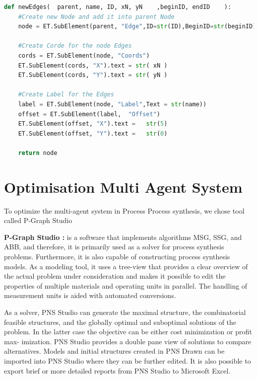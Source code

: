 \begin{lstlisting}[language=Python, caption=Python Function new Edges]
def newEdges(  parent, name, ID, xN, yN    ,beginID, endID    ):
	#Create new Node and add it into parent Node	
	node = ET.SubElement(parent, "Edge",ID=str(ID),BeginID=str(beginID),EndID=str(endID),Rate=str(name),Title=str(name), ArrowOnCenter="true", ArrowPosition="50")  
	
	#Create Corde for the node Edges
	cords = ET.SubElement(node, "Coords")
	ET.SubElement(cords, "X").text = str( xN )
	ET.SubElement(cords, "Y").text = str( yN )
		 		 		  
	#Create Label for the Edges
	label = ET.SubElement(node, "Label",Text = str(name))
	offset = ET.SubElement(label,  "Offset")
	ET.SubElement(offset, "X").text =   str(5)
	ET.SubElement(offset, "Y").text =   str(0)
 
	return node 
\end{lstlisting}


\pagebreak
\section{Optimisation Multi Agent System \label{sec:optim} }

To optimize the multi-agent system in  Process Process synthesis, we chose tool called  P-Graph Studio 

\textbf{P-Graph Studio : }   is a software that implements algorithms MSG, SSG, and ABB, and therefore, it is primarily
used as a solver for process synthesis problems. Furthermore, it is also capable of constructing process synthesis models.
As a modeling tool, it uses a tree-view that provides a clear overview of the actual problem under consideration and makes
it possible to edit the properties of multiple materials and operating units in parallel. The handling of measurement units
is aided with automated conversions. \cite{ ch3-pgraph2, Sitepgraph}

As a solver, PNS Studio can generate the maximal structure, the combinatorial feasible structures, and the globally optimal
and suboptimal solutions of the problem. In the latter case the objective can be either cost minimization or profit max-
imization. PNS Studio provides a double pane view of solutions to compare alternatives.
Models and initial structures created in PNS Drawn can be imported into PNS Studio where they can be further edited. It
is also possible to export brief or more detailed reports from PNS Studio to Microsoft Excel. \cite{ch3-pgraph}

